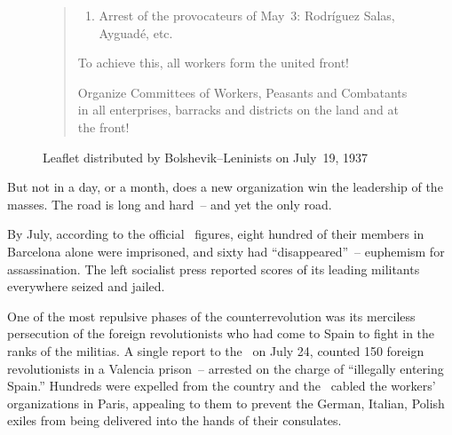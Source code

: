 \begin{figure}
\begin{oframed}
\begin{quote}
\begin{enumerate}[leftmargin=2em, labelindent=0.5em, itemindent=-1em]
      \item Arrest of the provocateurs of May~3: Rodr\'iguez Salas, Ayguad\'e, etc.
    \end{enumerate}
  
    \smallskip
  
    To achieve this, all workers form the united front!
    
    \smallskip
    
    Organize Committees of Workers, Peasants and Combatants in all enterprises, barracks and districts on the land and at the front!
    
    \medskip
  \end{quote}
\end{oframed}

\vspace{-0.5\baselineskip}

\caption{Leaflet distributed by Bolshevik--Leninists on July~19, 1937}
\label{fig:bolshlenleaflet2}
\end{figure}

But not in a day, or a month, does a new organization win the leadership of the masses. The road is long and hard~-- and yet the only road.

\dinkus

By July, according to the official \CNT\ figures, eight hundred of their members in Barcelona alone were imprisoned, and sixty had ``disappeared''~-- euphemism for assassination. The left socialist press reported scores of its leading militants everywhere seized and jailed.

One of the most repulsive phases of the counterrevolution was its merciless persecution of the foreign revolutionists who had come to Spain to fight in the ranks of the militias. A single report to the \CNT\ on July 24, counted 150 foreign revolutionists in a Valencia prison~-- arrested on the charge of ``illegally entering Spain.\kn\kn'' Hundreds were expelled from the country and the \CNT\ cabled the workers’ organizations in Paris, appealing to them to prevent the German, Italian, Polish exiles from being delivered into the hands of their consulates.
\nowidow

